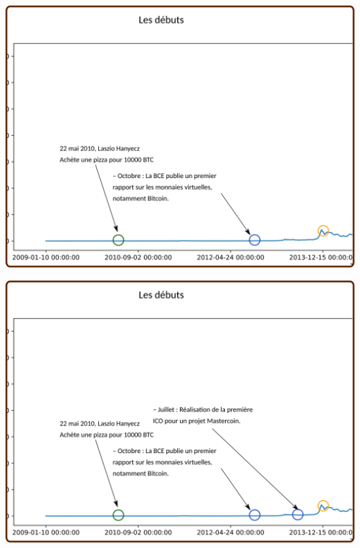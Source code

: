 \documentclass[presentation]{beamer}
\begin{document}
\begin{frame}[label={sec:org60a477c}]{}
\begin{center}
\includegraphics[width=.95\textwidth]{./Pictures/Timeline/10debut_BCE.png}
\end{center}
\end{frame}

\begin{frame}[label={sec:org571236c}]{}
\begin{center}
\includegraphics[width=.95\textwidth]{./Pictures/Timeline/11debut_ICO.png}
\end{center}
\end{frame}
\end{document}
